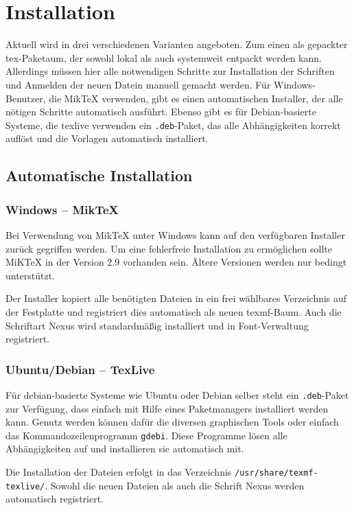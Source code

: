 \chapter{Installation}

Aktuell wird \tubslatex in drei verschiedenen Varianten angeboten.
Zum einen als gepackter tex-Paketaum, der sowohl lokal als auch systemweit
entpackt werden kann. Allerdings müssen hier alle notwendigen Schritte zur 
Installation der Schriften und Anmelden der neuen Datein manuell gemacht werden.
Für Windows-Benutzer, die MikTeX verwenden, gibt es einen automatischen
Installer, der alle nötigen Schritte automatisch ausführt.
Ebenso gibt es für Debian-basierte Systeme, die texlive verwenden ein
\texttt{.deb}-Paket, das alle Abhängigkeiten korrekt auflöst und die Vorlagen
automatisch installiert.

\section{Automatische Installation}

\subsection{Windows -- MikTeX}

Bei Verwendung von MikTeX unter Windows kann auf den verfügbaren Installer
zurück gegriffen werden. Um eine fehlerfreie Installation zu ermöglichen
sollte MiKTeX in der Version 2.9 vorhanden sein.
Ältere Versionen werden nur bedingt unterstützt.

Der Installer kopiert alle benötigten Dateien in ein frei wählbares Verzeichnis
auf der Festplatte und registriert dies automatisch als neuen texmf-Baum.
Auch die Schriftart Nexus wird standardmäßig installiert und in 
Font-Verwaltung registriert.

\subsection{Ubuntu/Debian -- TexLive}

Für debian-basierte Systeme wie Ubuntu oder Debian selber steht ein
\texttt{.deb}-Paket zur Verfügung, dass einfach mit Hilfe eines Paketmanagers
installiert werden kann.
Genutz werden können dafür die diversen graphischen Tools oder einfach das
Kommandozeilenprogramm \texttt{gdebi}. Diese Programme lösen alle Abhängigkeiten
auf und installieren sie automatisch mit.

Die Installation der Dateien erfolgt in das Verzeichnis
\lstinline{/usr/share/texmf-texlive/}. Sowohl die neuen Dateien als auch 
die Schrift Nexus werden automatisch registriert.

